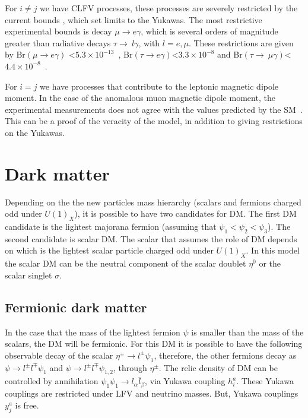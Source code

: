 \documentclass[12pt]{article}
\begin{document}
For $i \neq j$ we have CLFV processes, these processes are severely restricted by the current bounds , which set limits to the Yukawas. The most restrictive experimental bounds is decay $\mu \to e \gamma$, which is several orders of magnitude greater than radiative decays $\tau \to~l\gamma$, with $l = e, \mu$. These restrictions are given by Br$(\mu \to e\gamma)$ \textless $5.3 \times 10^{-13} $~\cite{Adam:2013mnn}, Br$(\tau \to e\gamma) $\textless$ 3.3 \times 10^{-8}$ and Br$(\tau \to~\mu\gamma) $\textless$ 4.4 \times 10^{-8}$~\cite{Aubert:2009ag, Bona:2007qt, Miyazaki:2012mx}. 

For $i = j$ we have processes that contribute to the leptonic magnetic dipole moment. In the case of the anomalous muon magnetic dipole moment, the experimental measurements does not agree with the values predicted by the SM~\cite{Lindner:2016bgg}. This can be a proof of the veracity of the model, in addition to giving restrictions on the Yukawas.

\section{Dark matter}
\label{sec:DM}
Depending on the the new particles mass hierarchy (scalars and fermions charged odd under $U(1)_X$), it is possible to have two candidates for DM. The first DM candidate is the lightest majorana fermion (assuming that $\psi_{1} < \psi_{2} < \psi_{3}$). The second candidate is scalar DM. The scalar that assumes the role of DM depends on which is the lightest scalar particle charged odd under $U(1)_X$. In this model the scalar DM can be the neutral component of the scalar doublet $\eta^{0}$ or the scalar singlet $\sigma$.

\subsection{Fermionic dark matter}
In the case that the mass of the lightest fermion $\psi$ is smaller than the mass of the scalars, the DM will be fermionic. For this DM it is possible to have the following observable decay of the scalar $\eta^{\pm} \to l^{\pm} \psi_{1}$, therefore, the other fermions decay as $ \psi \to l^{\pm} l^{\mp} \psi_{1}$ and $\psi \to l^{\pm} l^{\mp} \psi_{1,2} $, through $\eta^{\pm}$. The relic density of DM can be controlled by annihilation $\psi_{1} \psi_{1} \to l _{\alpha} \overline{l}_{\beta} $, via Yukawa coupling $h^{a}_{i}$. These Yukawa couplings are restricted under LFV and neutrino masses. But, Yukawa couplings $y^{a}_{j}$ is free.
\end{document}
